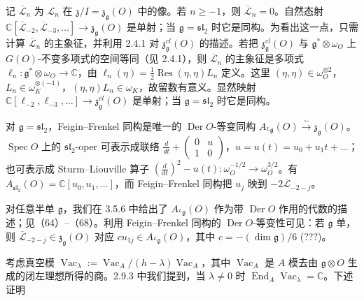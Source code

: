  记 $\overline{\mathcal{L}}_{n}$ 为 $\mathcal{L}_{n}$ 在 $\mathfrak{z}/I = \mathfrak{z}_{\mathfrak{g}}(O)$ 中的像。若 $n \ge -1$，则 $\overline{\mathcal{L}}_{n} = 0$。自然态射 $\mathbb{C}[\overline{\mathcal{L}}_{-2}, \overline{\mathcal{L}}_{-3}, \ldots] \to \mathfrak{z}_{\mathfrak{g}}(O)$ 是单射；当 $\mathfrak{g} = \mathfrak{sl}_{2}$ 时它是同构。为看出这一点，只需计算 $\overline{\mathcal{L}}_{n}$ 的主象征，并利用 2.4.1 对 $\mathfrak{z}^{cl}_{\mathfrak{g}}(O)$ 的描述。若把 $\mathfrak{z}^{cl}_{\mathfrak{g}}(O)$ 与 $\mathfrak{g}^{*}\otimes\omega_{O}$ 上 $G(O)$-不变多项式的空间等同（见 2.4.1），则 $\overline{\mathcal{L}}_{n}$ 的主象征是多项式 $\ell_{n}: \mathfrak{g}^{*}\otimes\omega_{O} \to \mathbb{C}$，由 $\ell_{n}(\eta) = \frac{1}{2}\operatorname{Res}(\eta, \eta)L_{n}$ 定义。这里 $(\eta, \eta) \in \omega_{O}^{\otimes 2}$，$L_{n} \in \omega_{K}^{\otimes(-1)}$，$(\eta, \eta)L_{n} \in \omega_{K}$，故留数有意义。显然映射 $\mathbb{C}[\ell_{-2}, \ell_{-3}, \ldots] \to \mathfrak{z}^{cl}_{\mathfrak{g}}(O)$ 是单射；当 $\mathfrak{g} = \mathfrak{sl}_{2}$ 时它是同构。

对 $\mathfrak{g} = \mathfrak{sl}_{2}$，Feigin--Frenkel 同构是唯一的 $\operatorname{Der} O$-等变同构 $A_{{}^{L}\mathfrak{g}}(O) \xrightarrow{\sim} \mathfrak{z}_{\mathfrak{g}}(O)$。$\operatorname{Spec} O$ 上的 $\mathfrak{sl}_{2}$-oper 可表示成联络 $\frac{d}{dt} + \begin{pmatrix} 0 & u \\ 1 & 0 \end{pmatrix}$，$u = u(t) = u_{0} + u_{1}t + \ldots$；也可表示成 Sturm--Liouville 算子 $(\frac{d}{dt})^{2} - u(t): \omega_{O}^{-1/2} \to \omega_{O}^{3/2}$。有 $A_{\mathfrak{sl}_{2}}(O) = \mathbb{C}[u_{0}, u_{1}, \ldots]$，而 Feigin--Frenkel 同构把 $u_{j}$ 映到 $-2\overline{\mathcal{L}}_{-2-j}$。

对任意半单 $\mathfrak{g}$，我们在 3.5.6 中给出了 $A_{{}^{L}\mathfrak{g}}(O)$ 作为带 $\operatorname{Der} O$ 作用的代数的描述；见（64）--（68）。利用 Feigin--Frenkel 同构的 $\operatorname{Der} O$-等变性可见：若 $\mathfrak{g}$ 单，则 $\overline{\mathcal{L}}_{-2-j} \in \mathfrak{z}_{\mathfrak{g}}(O)$ 对应 $cu_{1j} \in A_{{}^{L}\mathfrak{g}}(O)$，其中 $c = -(\dim\mathfrak{g})/6$ (???)。

 考虑真空模 $\operatorname{Vac}_{\lambda} := \operatorname{Vac}_{A}/(h-\lambda)\operatorname{Vac}_{A}$，其中 $\operatorname{Vac}_{A}$ 是 $A$ 模去由 $\mathfrak{g}\otimes O$ 生成的闭左理想所得的商。2.9.3 中我们提到，当 $\lambda \ne 0$ 时 $\operatorname{End}_{A}\operatorname{Vac}_{\lambda} = \mathbb{C}$。下述证明

